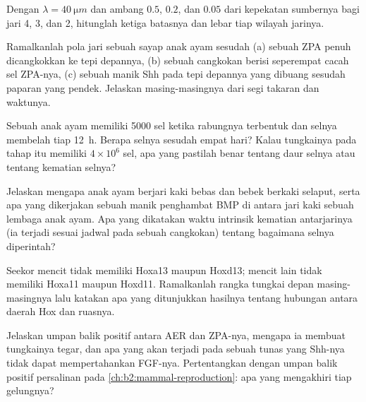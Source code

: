 \begin{exercise}[$\star\star$]\label{exo:b2:limb-organogenesis:5}
Dengan $\lambda = \qty{40}{\micro m}$ dan ambang $0.5$, $0.2$, dan
$0.05$ dari kepekatan sumbernya bagi jari 4, 3, dan 2, hitunglah ketiga
batasnya dan lebar tiap wilayah jarinya.
\end{exercise}

\begin{exercise}[$\star\star$]\label{exo:b2:limb-organogenesis:6}
Ramalkanlah pola jari sebuah sayap anak ayam sesudah (a) sebuah ZPA
penuh dicangkokkan ke tepi depannya, (b) sebuah cangkokan berisi
seperempat cacah sel ZPA-nya, (c) sebuah manik Shh pada tepi depannya
yang dibuang sesudah paparan yang pendek. Jelaskan masing-masingnya
dari segi takaran dan waktunya.
\end{exercise}

\begin{exercise}[$\star\star$]\label{exo:b2:limb-organogenesis:7}
Sebuah  anak ayam memiliki \num{5000} sel ketika rabungnya
terbentuk dan selnya membelah tiap \qty{12}{h}. Berapa selnya sesudah
empat hari? Kalau tungkainya pada tahap itu memiliki $4\times 10^{6}$
sel, apa yang pastilah benar tentang daur selnya atau tentang kematian
selnya?
\end{exercise}

\begin{exercise}[$\star\star$]\label{exo:b2:limb-organogenesis:8}
Jelaskan mengapa anak ayam berjari kaki bebas dan bebek berkaki
selaput, serta apa yang dikerjakan sebuah manik penghambat BMP di
antara jari kaki sebuah lembaga anak ayam. Apa yang dikatakan waktu
intrinsik kematian antarjarinya (ia terjadi sesuai jadwal pada sebuah
cangkokan) tentang bagaimana selnya diperintah?
\end{exercise}

\begin{exercise}[$\star\star$]\label{exo:b2:limb-organogenesis:9}
Seekor mencit tidak memiliki Hoxa13 maupun Hoxd13; mencit lain tidak
memiliki Hoxa11 maupun Hoxd11. Ramalkanlah rangka tungkai depan
masing-masingnya lalu katakan apa yang ditunjukkan hasilnya tentang
hubungan antara daerah Hox dan ruasnya.
\end{exercise}

\begin{exercise}[$\star\star\star$]\label{exo:b2:limb-organogenesis:10}
Jelaskan umpan balik positif antara AER dan ZPA-nya, mengapa ia
membuat tungkainya tegar, dan apa yang akan terjadi pada sebuah tunas
yang Shh-nya tidak dapat mempertahankan FGF-nya. Pertentangkan dengan
umpan balik positif persalinan pada \cref{ch:b2:mammal-reproduction}:
apa yang mengakhiri tiap gelungnya?
\end{exercise}


